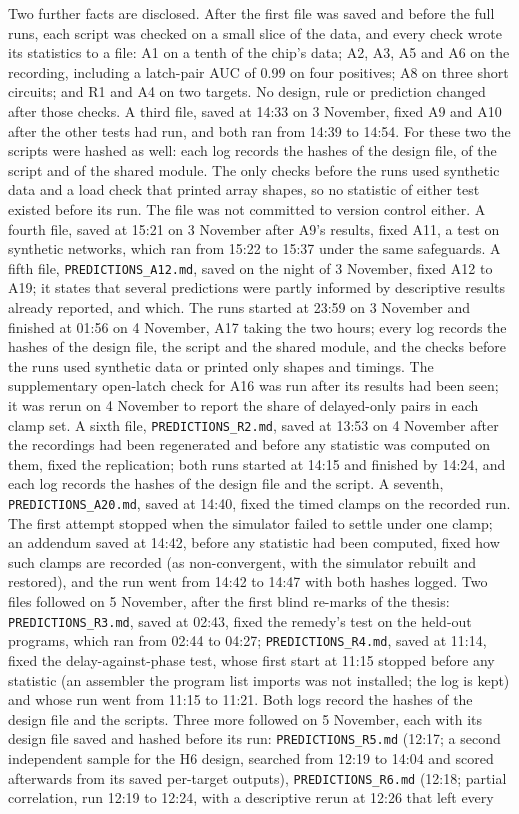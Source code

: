Two further facts are disclosed. After the first file was saved and before the full runs, each script was checked on a small slice of the data, and every check wrote its statistics to a file: A1 on a tenth of the chip's data; A2, A3, A5 and A6 on the recording, including a latch-pair AUC of 0.99 on four positives; A8 on three short circuits; and R1 and A4 on two targets. No design, rule or prediction changed after those checks. A third file, saved at 14:33 on 3 November, fixed A9 and A10 after the other tests had run, and both ran from 14:39 to 14:54. For these two the scripts were hashed as well: each log records the hashes of the design file, of the script and of the shared module. The only checks before the runs used synthetic data and a load check that printed array shapes, so no statistic of either test existed before its run. The file was not committed to version control either. A fourth file, saved at 15:21 on 3 November after A9's results, fixed A11, a test on synthetic networks, which ran from 15:22 to 15:37 under the same safeguards. A fifth file, \texttt{PREDICTIONS\_A12.md}, saved on the night of 3 November, fixed A12 to A19; it states that several predictions were partly informed by descriptive results already reported, and which. The runs started at 23:59 on 3 November and finished at 01:56 on 4 November, A17 taking the two hours; every log records the hashes of the design file, the script and the shared module, and the checks before the runs used synthetic data or printed only shapes and timings. The supplementary open-latch check for A16 was run after its results had been seen; it was rerun on 4 November to report the share of delayed-only pairs in each clamp set. A sixth file, \texttt{PREDICTIONS\_R2.md}, saved at 13:53 on 4 November after the recordings had been regenerated and before any statistic was computed on them, fixed the replication; both runs started at 14:15 and finished by 14:24, and each log records the hashes of the design file and the script. A seventh, \texttt{PREDICTIONS\_A20.md}, saved at 14:40, fixed the timed clamps on the recorded run. The first attempt stopped when the simulator failed to settle under one clamp; an addendum saved at 14:42, before any statistic had been computed, fixed how such clamps are recorded (as non-convergent, with the simulator rebuilt and restored), and the run went from 14:42 to 14:47 with both hashes logged. Two files followed on 5 November, after the first blind re-marks of the thesis: \texttt{PREDICTIONS\_R3.md}, saved at 02:43, fixed the remedy's test on the held-out programs, which ran from 02:44 to 04:27; \texttt{PREDICTIONS\_R4.md}, saved at 11:14, fixed the delay-against-phase test, whose first start at 11:15 stopped before any statistic (an assembler the program list imports was not installed; the log is kept) and whose run went from 11:15 to 11:21. Both logs record the hashes of the design file and the scripts. Three more followed on 5 November, each with its design file saved and hashed before its run: \texttt{PREDICTIONS\_R5.md} (12:17; a second independent sample for the H6 design, searched from 12:19 to 14:04 and scored afterwards from its saved per-target outputs), \texttt{PREDICTIONS\_R6.md} (12:18; partial correlation, run 12:19 to 12:24, with a descriptive rerun at 12:26 that left every 